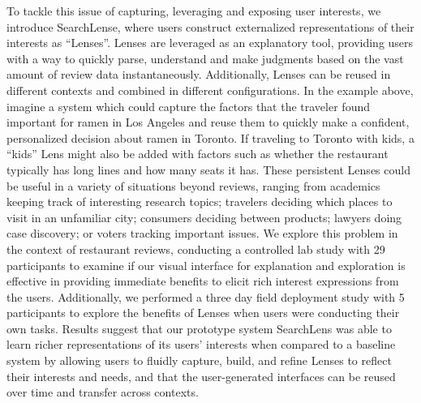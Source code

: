 To tackle this issue of capturing, leveraging and exposing user interests, we introduce SearchLense, where users construct externalized representations of their interests as ``Lenses''. Lenses are leveraged as an explanatory tool, providing users with a way to quickly parse, understand and make judgments based on the vast amount of review data instantaneously. Additionally, Lenses can be reused in different contexts and combined in different configurations. In the example above, imagine a system which could capture the factors that the traveler found important for ramen in Los Angeles and reuse them to quickly make a confident, personalized decision about ramen in Toronto. If traveling to Toronto with kids, a ``kids'' Lens might also be added with factors such as whether the restaurant typically has long lines and how many seats it has. These persistent Lenses could be useful in a variety of situations beyond reviews, ranging from academics keeping track of interesting research topics; travelers deciding which places to visit in an unfamiliar city; consumers deciding between products; lawyers doing case discovery; or voters tracking important issues.
We explore this problem in the context of restaurant reviews, conducting a controlled lab study with 29 participants to examine if our visual interface for explanation and exploration is effective in providing immediate benefits to elicit rich interest expressions from the users. Additionally, we performed a three day field deployment study with 5 participants to explore the benefits of Lenses when users were conducting their own tasks. Results suggest that our prototype system SearchLens was able to learn richer representations of its users' interests when compared to a baseline system by allowing users to fluidly capture, build, and refine Lenses to reflect their interests and needs, and that the user-generated interfaces can be reused over time and transfer across contexts.





